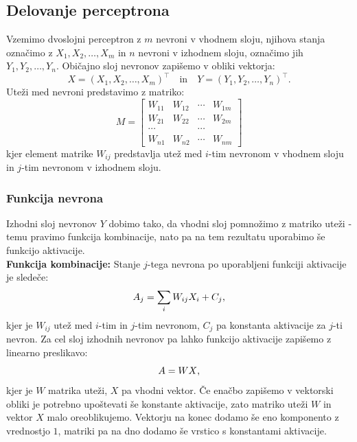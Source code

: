 \documentclass[mat1]{fmfdelo}
\begin{document}
\subsection{Delovanje perceptrona}
Vzemimo dvoslojni perceptron z $m$ nevroni v vhodnem sloju, njihova stanja  označimo z $X_1, X_2, \ldots, X_m$ in $n$ nevroni v izhodnem sloju, označimo jih $Y_1, Y_2, \ldots, Y_{n}$. Običajno sloj nevronov zapišemo v obliki vektorja:
%
\begin{equation*}
X = (X_1, X_2, \dotso, X_m)^\intercal  \quad \text{in} \quad  Y = (Y_1, Y_2, \dotso, Y_n)^\intercal \text{.}
\end{equation*}
%
Uteži med nevroni predstavimo z matriko:
%
\begin{equation*}
M = \begin{bmatrix}
W_{11} &W_{12}  & \cdots & W_{1m}  \\
W_{21}  &W_{22}  &\cdots & W_{2m}  \\
\cdots &  &\cdots &  \\
W_{n1} & W_{n2} & \cdots & W_{nm} 
\end{bmatrix}  
\end{equation*}
%
kjer element matrike $W_{ij}$ predstavlja utež med $i$-tim nevronom v vhodnem sloju in $j$-tim nevronom v izhodnem sloju.
%
\subsubsection{Funkcija nevrona}
Izhodni sloj nevronov $Y$ dobimo tako, da vhodni sloj pomnožimo z matriko uteži - temu pravimo funkcija kombinacije, nato pa na tem rezultatu uporabimo še funkcijo aktivacije.\\
%

\textbf{Funkcija kombinacije:}
Stanje $j$-tega nevrona po uporabljeni funkciji aktivacije je sledeče:
%
\begin{equation*}
A_j= \sum_{i}W_{ij}X_i + C_j \text,
\end{equation*}
%
kjer je $W_{ij}$ utež med $i$-tim in $j$-tim nevronom, $C_j$ pa konstanta aktivacije za $j$-ti nevron. 
Za cel sloj izhodnih nevronov pa lahko funkcijo aktivacije zapišemo z linearno preslikavo:
%
\begin{equation*}
A = WX \text,
\end{equation*}
%
kjer je $W$ matrika uteži, $X$ pa vhodni vektor. Če enačbo zapišemo v vektorski obliki je potrebno upoštevati še konstante aktivacije, zato matriko uteži $W$ in vektor $X$ malo oreoblikujemo. Vektorju na konec dodamo še eno komponento z vrednostjo $1$, matriki pa na dno dodamo še vrstico s konstantami aktivacije. \\ 
\end{document}
